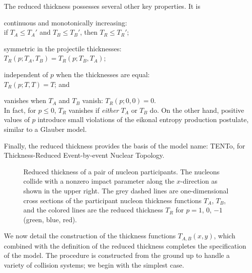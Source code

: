 \documentclass[aps,prc,reprint,amsmath,nofootinbib]{revtex4-1}
\newcommand{\trento}{T\raisebox{-.5ex}{R}ENTo}
\begin{document}
The reduced thickness possesses several other key properties.  It is
\begin{enumerate*}
  \renewcommand{\labelenumi}{(\alph{enumi})}
  \item continuous and monotonically increasing: \\
    if $T_A \leq T_A'$ and $T_B \leq T_B'$, then $T_R \leq T_R'$;
  \item symmetric in the projectile thicknesses: \\
    $T_R(p; T_A, T_B) = T_R(p; T_B, T_A)$;
  \item independent of $p$ when the thicknesses are equal: \\
    $T_R(p; T, T) = T$; and
  \item vanishes when $T_A$ and $T_B$ vanish: $T_R(p; 0, 0) = 0$. \\
    In fact, for $p \leq 0$, $T_R$ vanishes if \emph{either} $T_A$ or $T_B$ do.
    On the other hand, positive values of $p$ introduce small violations of the eikonal entropy production postulate, similar to a Glauber model.
\end{enumerate*}

Finally, the reduced thickness provides the basis of the model name:
\trento, for Thickness-Reduced Event-by-event Nuclear Topology.

\begin{figure}[t]
  \caption{
    \label{fig:TR}
    Reduced thickness of a pair of nucleon participants.
    The nucleons collide with a nonzero impact parameter along the $x$-direction as shown in the upper right.
    The grey dashed lines are one-dimensional cross sections of the participant nucleon thickness functions $T_A$, $T_B$, and the colored lines are the reduced thickness $T_R$ for $p = 1$, 0, $-1$ (green, blue, red).
  }
\end{figure}

We now detail the construction of the thickness functions $T_{A,B}(x, y)$, which combined with the definition
of the reduced thickness completes the specification of the model.  The procedure is constructed from the
ground up to handle a variety of collision systems; we begin with the simplest case.
\end{document}
